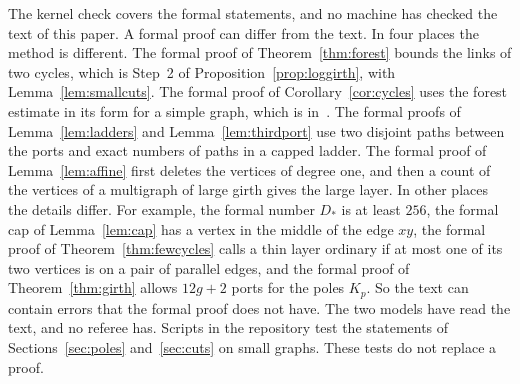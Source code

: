 The kernel check covers the formal statements, and no machine has checked the text of this
paper. A formal proof can differ from the text. In four places the method is different. The
formal proof of Theorem~\ref{thm:forest} bounds the links of two cycles, which is Step~2 of
Proposition~\ref{prop:loggirth}, with Lemma~\ref{lem:smallcuts}. The formal proof of Corollary~\ref{cor:cycles} uses the forest
estimate in its form for a simple graph, which is in~\cite{Pan}. The formal proofs of
Lemma~\ref{lem:ladders} and
Lemma~\ref{lem:thirdport} use two disjoint paths between the ports and exact numbers of paths in
a capped ladder. The formal proof of Lemma~\ref{lem:affine} first deletes the vertices of degree
one, and then a count of the vertices of a multigraph of large girth gives the large layer. In
other places the details differ. For example, the formal number $D_*$ is at least $256$, the
formal cap of Lemma~\ref{lem:cap} has a vertex in the middle of the edge $xy$, the formal proof
of Theorem~\ref{thm:fewcycles} calls a thin layer ordinary if at most one of its two vertices is
on a pair of parallel edges, and the formal proof of Theorem~\ref{thm:girth} allows $12g+2$
ports for the poles $K_p$. So the text can contain errors that the formal proof does not have.
The two models have read the text, and no referee has. Scripts in the repository test the
statements of Sections~\ref{sec:poles} and~\ref{sec:cuts} on small graphs. These tests do not
replace a proof.
